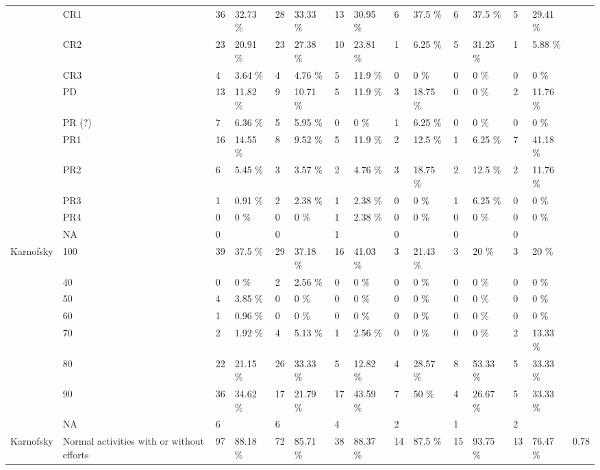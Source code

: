 \documentclass[a4paper,11pt] {article}
\begin{document}
\begin{landscape}
\begin{longtable}{lllllllllllllll}
   & CR1 & 36 & 32.73 \% & 28 & 33.33 \% & 13 & 30.95 \% & 6 & 37.5 \% & 6 & 37.5 \% & 5 & 29.41 \% &  \\ 
   & CR2 & 23 & 20.91 \% & 23 & 27.38 \% & 10 & 23.81 \% & 1 & 6.25 \% & 5 & 31.25 \% & 1 & 5.88 \% &  \\ 
   & CR3 & 4 & 3.64 \% & 4 & 4.76 \% & 5 & 11.9 \% & 0 & 0 \% & 0 & 0 \% & 0 & 0 \% &  \\ 
   & PD & 13 & 11.82 \% & 9 & 10.71 \% & 5 & 11.9 \% & 3 & 18.75 \% & 0 & 0 \% & 2 & 11.76 \% &  \\ 
   & PR (?) & 7 & 6.36 \% & 5 & 5.95 \% & 0 & 0 \% & 1 & 6.25 \% & 0 & 0 \% & 0 & 0 \% &  \\ 
   & PR1 & 16 & 14.55 \% & 8 & 9.52 \% & 5 & 11.9 \% & 2 & 12.5 \% & 1 & 6.25 \% & 7 & 41.18 \% &  \\ 
   & PR2 & 6 & 5.45 \% & 3 & 3.57 \% & 2 & 4.76 \% & 3 & 18.75 \% & 2 & 12.5 \% & 2 & 11.76 \% &  \\ 
   & PR3 & 1 & 0.91 \% & 2 & 2.38 \% & 1 & 2.38 \% & 0 & 0 \% & 1 & 6.25 \% & 0 & 0 \% &  \\ 
   & PR4 & 0 & 0 \% & 0 & 0 \% & 1 & 2.38 \% & 0 & 0 \% & 0 & 0 \% & 0 & 0 \% &  \\ 
   & NA & 0 &  & 0 &  & 1 &  & 0 &  & 0 &  & 0 &  &  \\ 
  Karnofsky & 100 & 39 & 37.5 \% & 29 & 37.18 \% & 16 & 41.03 \% & 3 & 21.43 \% & 3 & 20 \% & 3 & 20 \% &  \\ 
   & 40 & 0 & 0 \% & 2 & 2.56 \% & 0 & 0 \% & 0 & 0 \% & 0 & 0 \% & 0 & 0 \% &  \\ 
   & 50 & 4 & 3.85 \% & 0 & 0 \% & 0 & 0 \% & 0 & 0 \% & 0 & 0 \% & 0 & 0 \% &  \\ 
   & 60 & 1 & 0.96 \% & 0 & 0 \% & 0 & 0 \% & 0 & 0 \% & 0 & 0 \% & 0 & 0 \% &  \\ 
   & 70 & 2 & 1.92 \% & 4 & 5.13 \% & 1 & 2.56 \% & 0 & 0 \% & 0 & 0 \% & 2 & 13.33 \% &  \\ 
   & 80 & 22 & 21.15 \% & 26 & 33.33 \% & 5 & 12.82 \% & 4 & 28.57 \% & 8 & 53.33 \% & 5 & 33.33 \% &  \\ 
   & 90 & 36 & 34.62 \% & 17 & 21.79 \% & 17 & 43.59 \% & 7 & 50 \% & 4 & 26.67 \% & 5 & 33.33 \% &  \\ 
   & NA & 6 &  & 6 &  & 4 &  & 2 &  & 1 &  & 2 &  &  \\ 
  Karnofsky & Normal activities 
                                            with or without efforts & 97 & 88.18 \% & 72 & 85.71 \% & 38 & 88.37 \% & 14 & 87.5 \% & 15 & 93.75 \% & 13 & 76.47 \% & 0.78 \\ 

\end{longtable}
\end{landscape}
\end{document}
